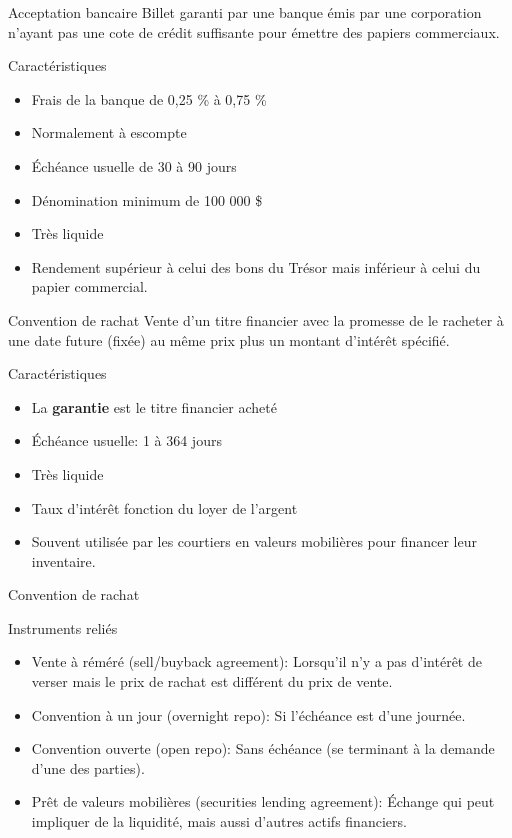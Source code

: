 \documentclass{beamer}
\begin{document}
\begin{frame}{Acceptation bancaire}
Billet garanti par une banque émis par une corporation n’ayant pas une cote de crédit suffisante pour émettre des papiers commerciaux.
\begin{block}{Caractéristiques}
\begin{itemize}
\item Frais de la banque de 0,25 \% à 0,75 \%
\item Normalement à escompte
\item Échéance usuelle de 30 à 90 jours
\item Dénomination minimum de 100 000 \$
\item Très liquide
\item Rendement supérieur à celui des bons du Trésor mais inférieur à celui du papier commercial.
\end{itemize}
\end{block}
\end{frame}


\begin{frame}{Convention de rachat}
Vente d’un titre financier avec la promesse de le racheter à une date future (fixée) au même prix plus un montant d’intérêt spécifié.
\begin{block}{Caractéristiques}
\begin{itemize}
\item La \textbf{garantie} est le titre financier acheté
\item Échéance usuelle: 1 à 364 jours
\item Très liquide
\item Taux d’intérêt fonction du loyer de l’argent
\item Souvent utilisée par les courtiers en valeurs mobilières pour financer leur inventaire.
\end{itemize}
\end{block}
\end{frame}


\begin{frame}{Convention de rachat}

\begin{block}{Instruments reliés}
\begin{itemize}
\item Vente à réméré (sell/buyback agreement): Lorsqu’il n’y a pas d’intérêt de verser mais le prix de rachat est différent du prix de vente.
\item Convention à un jour (overnight repo): Si l’échéance est d’une journée.
\item Convention ouverte (open repo): Sans échéance (se terminant à la demande d’une des parties).
\item Prêt de valeurs mobilières (securities lending agreement): Échange qui peut impliquer de la liquidité, mais aussi d’autres actifs financiers.
\end{itemize}
\end{block}
\end{frame}
\end{document}

